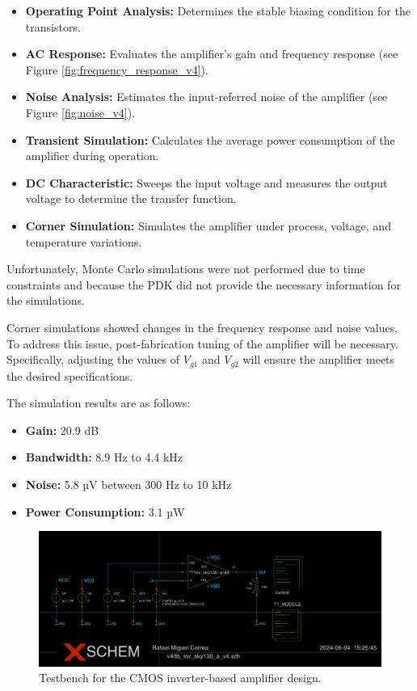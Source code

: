 \begin{itemize}
\item \textbf{Operating Point Analysis:} Determines the stable biasing condition for the transistors.
\item \textbf{AC Response:} Evaluates the amplifier's gain and frequency response (see Figure \ref{fig:frequency_response_v4}).
\item \textbf{Noise Analysis:} Estimates the input-referred noise of the amplifier (see Figure \ref{fig:noise_v4}).
\item \textbf{Transient Simulation:} Calculates the average power consumption of the amplifier during operation.
\item \textbf{DC Characteristic:} Sweeps the input voltage and measures the output voltage to determine the transfer function.
\item \textbf{Corner Simulation:} Simulates the amplifier under process, voltage, and temperature variations.
\end{itemize}

Unfortunately, Monte Carlo simulations were not performed due to time constraints and because the PDK did not provide the necessary information for the simulations.

Corner simulations showed changes in the frequency response and noise values. To address this issue, post-fabrication tuning of the amplifier will be necessary. 
Specifically, adjusting the values of $V_{g1}$ and $V_{g2}$ will ensure the amplifier meets the desired specifications.

The simulation results are as follows:

\begin{itemize}
\item \textbf{Gain:} 20.9 dB
\item \textbf{Bandwidth:} 8.9 Hz to 4.4 kHz
\item \textbf{Noise:} 5.8 µV between 300 Hz to 10 kHz
\item \textbf{Power Consumption:} 3.1 µW
\end{itemize}

\begin{figure}[ht!]
\centering
\includegraphics[width=\textwidth]{Figures/testbench.png}
\caption{Testbench for the CMOS inverter-based amplifier design.}
\label{fig:testbench_v4}
\end{figure}

